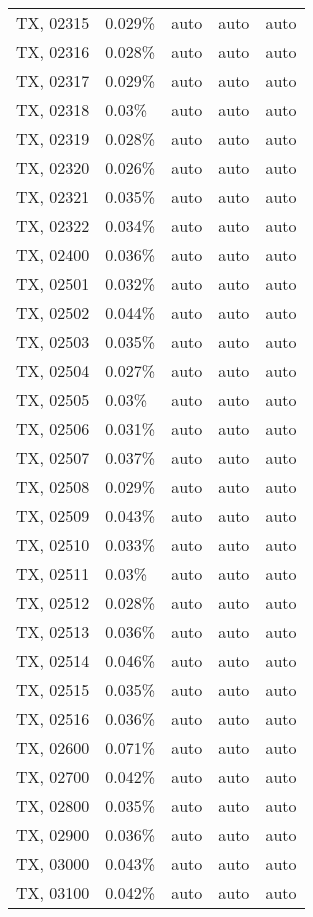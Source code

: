 \begin{longtable}[]{@{}lllll@{}}
TX, 02315 & 0.029\% & auto & auto & auto \\
TX, 02316 & 0.028\% & auto & auto & auto \\
TX, 02317 & 0.029\% & auto & auto & auto \\
TX, 02318 & 0.03\% & auto & auto & auto \\
TX, 02319 & 0.028\% & auto & auto & auto \\
TX, 02320 & 0.026\% & auto & auto & auto \\
TX, 02321 & 0.035\% & auto & auto & auto \\
TX, 02322 & 0.034\% & auto & auto & auto \\
TX, 02400 & 0.036\% & auto & auto & auto \\
TX, 02501 & 0.032\% & auto & auto & auto \\
TX, 02502 & 0.044\% & auto & auto & auto \\
TX, 02503 & 0.035\% & auto & auto & auto \\
TX, 02504 & 0.027\% & auto & auto & auto \\
TX, 02505 & 0.03\% & auto & auto & auto \\
TX, 02506 & 0.031\% & auto & auto & auto \\
TX, 02507 & 0.037\% & auto & auto & auto \\
TX, 02508 & 0.029\% & auto & auto & auto \\
TX, 02509 & 0.043\% & auto & auto & auto \\
TX, 02510 & 0.033\% & auto & auto & auto \\
TX, 02511 & 0.03\% & auto & auto & auto \\
TX, 02512 & 0.028\% & auto & auto & auto \\
TX, 02513 & 0.036\% & auto & auto & auto \\
TX, 02514 & 0.046\% & auto & auto & auto \\
TX, 02515 & 0.035\% & auto & auto & auto \\
TX, 02516 & 0.036\% & auto & auto & auto \\
TX, 02600 & 0.071\% & auto & auto & auto \\
TX, 02700 & 0.042\% & auto & auto & auto \\
TX, 02800 & 0.035\% & auto & auto & auto \\
TX, 02900 & 0.036\% & auto & auto & auto \\
TX, 03000 & 0.043\% & auto & auto & auto \\
TX, 03100 & 0.042\% & auto & auto & auto \\

\end{longtable}
